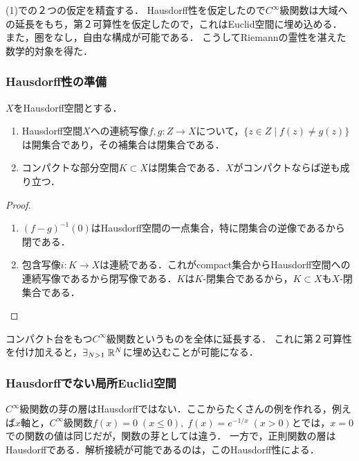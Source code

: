 \documentclass[uplatex,dvipdfmx]{jsreport}
\begin{document}
\begin{tcolorbox}[colframe=ForestGreen, colback=ForestGreen!10!white,breakable,colbacktitle=ForestGreen!40!white,coltitle=black,fonttitle=\bfseries\sffamily,
title=]
    (1)での２つの仮定を精査する．
    Hausdorff性を仮定したので$C^\infty$級関数は大域への延長をもち，第２可算性を仮定したので，これはEuclid空間に埋め込める．
    また，圏をなし，自由な構成が可能である．
    こうしてRiemannの霊性を湛えた数学的対象を得た．
\end{tcolorbox}

\subsubsection{Hausdorff性の準備}

\begin{lemma}
    $X$をHausdorff空間とする．
    \begin{enumerate}
        \item Hausdorff空間$X$への連続写像$f,g:Z\to X$について，$\{z\in Z\mid f(z)\ne g(z)\}$は開集合であり，その補集合は閉集合である．
        \item コンパクトな部分空間$K\subset X$は閉集合である．$X$がコンパクトならば逆も成り立つ．
    \end{enumerate}
\end{lemma}
\begin{proof}\mbox{}
    \begin{enumerate}
        \item $(f-g)^{-1}(0)$はHausdorff空間の一点集合，特に閉集合の逆像であるから閉である．
        \item 包含写像$i:K\to X$は連続である．これがcompact集合からHausdorff空間への連続写像であるから閉写像である．$K$は$K$-閉集合であるから，$K\subset X$も$X$-閉集合である．
    \end{enumerate}
\end{proof}
\begin{remark}
    コンパクト台をもつ$C^\infty$級関数というものを全体に延長する．
    これに第２可算性を付け加えると，$\exists_{N>1}\;\mathbb{R}^N$に埋め込むことが可能になる．
\end{remark}

\subsubsection{Hausdorffでない局所Euclid空間}

\begin{tcolorbox}[colframe=ForestGreen, colback=ForestGreen!10!white,breakable,colbacktitle=ForestGreen!40!white,coltitle=black,fonttitle=\bfseries\sffamily,
title=]
    $C^\infty$級関数の芽の層はHausdorffではない．ここからたくさんの例を作れる，例えば$x$軸と，$C^\infty$級関数$f(x)=0\;(x\le 0),\;f(x)=e^{-1/x}\;(x>0)$とでは，$x=0$での関数の値は同じだが，関数の芽としては違う．
    一方で，正則関数の層はHausdorffである．解析接続が可能であるのは，このHausdorff性による．
\end{tcolorbox}
\end{document}
